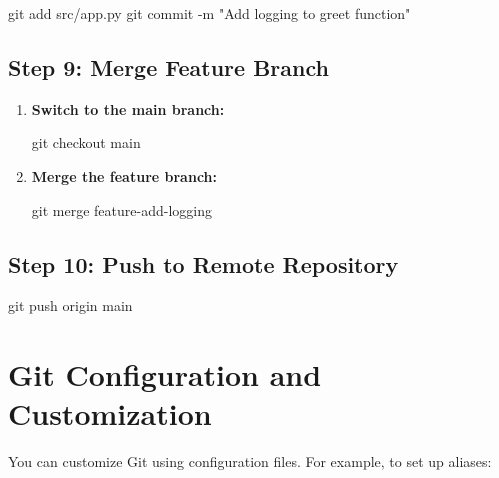 \documentclass[
  letterpaper,
  DIV=11,
  numbers=noendperiod]{scrreprt}
\newenvironment{Shaded}{\begin{snugshade}}{\end{snugshade}}
\newcommand{\AttributeTok}[1]{\textcolor[rgb]{0.40,0.45,0.13}{#1}}
\newcommand{\FunctionTok}[1]{\textcolor[rgb]{0.28,0.35,0.67}{#1}}
\newcommand{\NormalTok}[1]{\textcolor[rgb]{0.00,0.23,0.31}{#1}}
\newcommand{\StringTok}[1]{\textcolor[rgb]{0.13,0.47,0.30}{#1}}
\begin{document}
\begin{Shaded}
\begin{Highlighting}[]
\FunctionTok{git}\NormalTok{ add src/app.py}
\FunctionTok{git}\NormalTok{ commit }\AttributeTok{{-}m} \StringTok{"Add logging to greet function"}
\end{Highlighting}
\end{Shaded}

\subsection{Step 9: Merge Feature
Branch}\label{step-9-merge-feature-branch}

\begin{enumerate}
\def\labelenumi{\arabic{enumi}.}
\item
  \textbf{Switch to the main branch:}

\begin{Shaded}
\begin{Highlighting}[]
\FunctionTok{git}\NormalTok{ checkout main}
\end{Highlighting}
\end{Shaded}
\item
  \textbf{Merge the feature branch:}

\begin{Shaded}
\begin{Highlighting}[]
\FunctionTok{git}\NormalTok{ merge feature{-}add{-}logging}
\end{Highlighting}
\end{Shaded}
\end{enumerate}

\subsection{Step 10: Push to Remote
Repository}\label{step-10-push-to-remote-repository}

\begin{Shaded}
\begin{Highlighting}[]
\FunctionTok{git}\NormalTok{ push origin main}
\end{Highlighting}
\end{Shaded}

\section{Git Configuration and
Customization}\label{git-configuration-and-customization}

You can customize Git using configuration files. For example, to set up
aliases:
\end{document}
